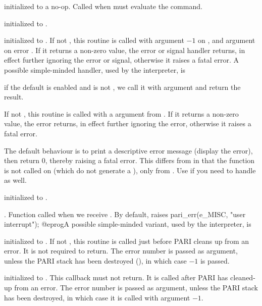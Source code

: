 initialized to a no-op. Called when  must evaluate the 
command.

initialized to .

initialized to . If not , this routine is called with
argument $-1$ on , and argument  on error . If
it returns a non-zero value, the error or signal handler returns, in effect
further ignoring the error or signal, otherwise it raises a fatal error.
A possible simple-minded handler, used by the  interpreter, is

 if the 
default is enabled and  is not , we call it
with  argument and return the result.

If not , this routine is called with a  argument
from . If it returns a non-zero value, the error returns, in
effect further ignoring the error, otherwise it raises a fatal error.

The default behaviour is to print a descriptive error
message (display the error), then return 0, thereby raising a fatal error.
This differs from  in that the
function is not called on  (which do not generate a ),
only from . Use  if you need to handle
 as well.

initialized to .

.
Function called when we receive . By default, raises
\bprog
  pari_err(e_MISC, "user interrupt");
@eprog\noindent A possible simple-minded variant, used by the
 interpreter, is


initialized to . If not , this routine is called just
before PARI cleans up from an error. It is not required to return.  The error
number is passed as argument, unless the PARI stack has been destroyed
(), in which case $-1$ is passed.

initialized to . This callback must not return.
It is called after PARI has cleaned-up from an error. The error number is
passed as argument, unless the PARI stack has been destroyed, in which case
it is called with argument $-1$.

